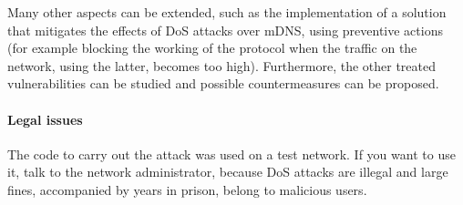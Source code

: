 \documentclass[fleqn, 11pt]{SelfArx} %
\begin{document}
Many other aspects can be extended, such as the implementation of a solution that mitigates the effects of DoS attacks over mDNS, using preventive actions 
(for example blocking the working of the protocol when the traffic on the network, using the latter, becomes too high).
Furthermore, the other treated vulnerabilities can be studied and possible countermeasures can be proposed.

\paragraph{Legal issues \cite{IllegalIssues}} The code to carry out the attack was used on a test network. If you want to use it, talk to the network administrator, because DoS attacks are illegal and large fines, accompanied by years in prison, belong to malicious users.




\end{document}
